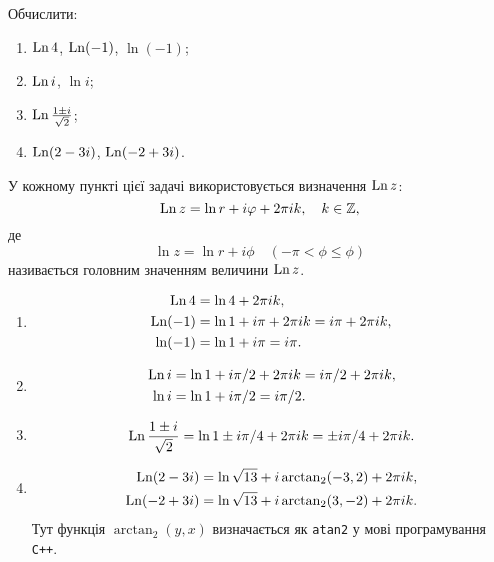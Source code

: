 \setcounter{problem}{70}
\begin{problem}
	Обчислити:
	\begin{enumerate}
		\item $\operatorname{Ln} 4$, $\operatorname{Ln}(-1)$, $\ln(-1)$;
		\item $\operatorname{Ln} i$, $\ln i$;
		\item $\operatorname{Ln} \frac{1 \pm i}{\sqrt{2}}$;
		\item $\operatorname{Ln}(2 - 3i)$, $\operatorname{Ln}(-2+3i)$.
	\end{enumerate}
\end{problem}
\begin{solution}
	У кожному пункті цієї задачі використовується визначення $\operatorname{Ln} z$:
	\begin{equation}
		\label{eq:1.5}
		\operatorname{Ln} z = \ln r + i \varphi + 2 \pi i k, \quad k \in \mathbb{Z},
	\end{equation}
	де
	\begin{equation}
		\label{eq:1.6}
		\ln z = \ln r + i \phi \quad (-\pi < \phi \le \phi)
	\end{equation}
	називається головним значенням величини $\operatorname{Ln} z$.
	\begin{enumerate}
		\item \begin{align*}
			\operatorname{Ln} 4 &= \ln 4 + 2 \pi i k, \\
			\operatorname{Ln} (-1) &= \ln 1 + i \pi + 2 \pi i k = i \pi + 2 \pi i k, \\
			\ln (-1) &= \ln 1 + i \pi = i \pi.
		\end{align*}
		\item \begin{align*}
			\operatorname{Ln} i &= \ln 1 + i \pi / 2 + 2 \pi i k = i \pi / 2 + 2 \pi i k, \\
			\ln i &= \ln 1 + i \pi / 2 = i \pi / 2.
		\end{align*}
		\item \[ \operatorname{Ln} \frac {1 \pm i}{\sqrt 2} = \ln 1 \pm i \pi / 4 + 2 \pi i k = \pm i \pi / 4 + 2 \pi i k. \]
		\item \begin{align*}
			\operatorname{Ln} (2 - 3i) &= \ln \sqrt{13} + i \arctan_2 (-3, 2) + 2 \pi i k, \\
			\operatorname{Ln} (- 2 + 3i) &= \ln \sqrt{13} + i \arctan_2 (3, -2) + 2 \pi i k.
		\end{align*}
		Тут функція $\arctan_2(y, x)$ визначається як \verb|atan2| у мові програмування \verb|C++|. 
	\end{enumerate}
\end{solution}


